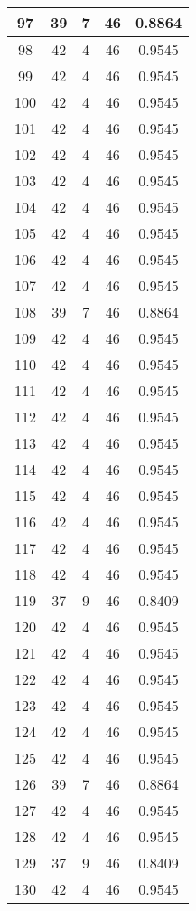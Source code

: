 \documentclass[letterpaper, 12pt]{article}
\begin{document}
\begin{longtable}{|c|c|c|c|c|}
\hline
97 & 39 & 7 & 46 & 0.8864 \\
\hline
98 & 42 & 4 & 46 & 0.9545 \\
\hline
99 & 42 & 4 & 46 & 0.9545 \\
\hline
100 & 42 & 4 & 46 & 0.9545 \\
\hline
101 & 42 & 4 & 46 & 0.9545 \\
\hline
102 & 42 & 4 & 46 & 0.9545 \\
\hline
103 & 42 & 4 & 46 & 0.9545 \\
\hline
104 & 42 & 4 & 46 & 0.9545 \\
\hline
105 & 42 & 4 & 46 & 0.9545 \\
\hline
106 & 42 & 4 & 46 & 0.9545 \\
\hline
107 & 42 & 4 & 46 & 0.9545 \\
\hline
108 & 39 & 7 & 46 & 0.8864 \\
\hline
109 & 42 & 4 & 46 & 0.9545 \\
\hline
110 & 42 & 4 & 46 & 0.9545 \\
\hline
111 & 42 & 4 & 46 & 0.9545 \\
\hline
112 & 42 & 4 & 46 & 0.9545 \\
\hline
113 & 42 & 4 & 46 & 0.9545 \\
\hline
114 & 42 & 4 & 46 & 0.9545 \\
\hline
115 & 42 & 4 & 46 & 0.9545 \\
\hline
116 & 42 & 4 & 46 & 0.9545 \\
\hline
117 & 42 & 4 & 46 & 0.9545 \\
\hline
118 & 42 & 4 & 46 & 0.9545 \\
\hline
119 & 37 & 9 & 46 & 0.8409 \\
\hline
120 & 42 & 4 & 46 & 0.9545 \\
\hline
121 & 42 & 4 & 46 & 0.9545 \\
\hline
122 & 42 & 4 & 46 & 0.9545 \\
\hline
123 & 42 & 4 & 46 & 0.9545 \\
\hline
124 & 42 & 4 & 46 & 0.9545 \\
\hline
125 & 42 & 4 & 46 & 0.9545 \\
\hline
126 & 39 & 7 & 46 & 0.8864 \\
\hline
127 & 42 & 4 & 46 & 0.9545 \\
\hline
128 & 42 & 4 & 46 & 0.9545 \\
\hline
129 & 37 & 9 & 46 & 0.8409 \\
\hline
130 & 42 & 4 & 46 & 0.9545 \\

\end{longtable}
\end{document}
